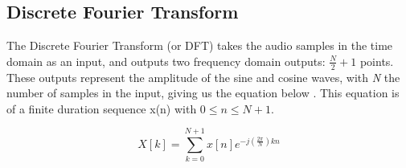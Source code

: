 \subsection{Discrete Fourier Transform}
The Discrete Fourier Transform (or DFT) takes the audio samples in the time domain as an input, and outputs two frequency domain outputs: $\frac{N}{2} + 1$ points. These outputs represent the amplitude of the sine and cosine waves, with \textit{N} the number of samples in the input, giving us the equation below \cite{Gold_Morgan_Ellis_2011}. This equation is of a finite duration sequence x(n)
with $0 \leq n \leq N + 1$.

\begin{equation}\label{eq:dft-equation}
    X[k] = \sum_{k=0}^{N+1}x[n]e^{-j (\frac{2\pi}{N})kn}
\end{equation}



